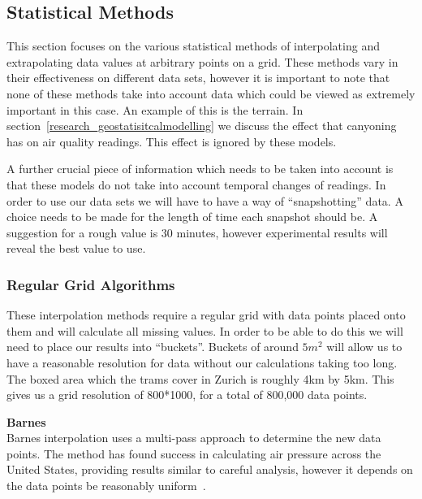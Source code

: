 	\subsection{Statistical Methods}\label{datavalidation_statisticalmethods}
		This section focuses on the various statistical methods of interpolating and extrapolating data values at arbitrary points on a grid. These methods vary in their effectiveness on different data sets, however it is important to note that none of these methods take into account data which could be viewed as extremely important in this case. An example of this is the terrain. In section~\ref{research_geostatisitcalmodelling} we discuss the effect that canyoning has on air quality readings. This effect is ignored by these models. 

		A further crucial piece of information which needs to be taken into account is that these models do not take into account temporal changes of readings. In order to use our data sets we will have to have a way of ``snapshotting'' data. A choice needs to be made for the length of time each snapshot should be. A suggestion for a rough value is 30 minutes, however experimental results will reveal the best value to use.



		\subsubsection{Regular Grid Algorithms}\label{datavalidation_regulargrid}

			These interpolation methods require a regular grid with data points placed onto them and will calculate all missing values. In order to be able to do this we will need to place our results into ``buckets''. Buckets of around $5m^{2}$ will allow us to have a reasonable resolution for data without our calculations taking too long. The boxed area which the trams cover in Zurich is roughly 4km by 5km. This gives us a grid resolution of 800*1000, for a total of 800,000 data points. 

			\textbf{Barnes}\label{datavalidation_barnes} \\

				Barnes interpolation uses a multi-pass approach to determine the new data points. The method has found success in calculating air pressure across the United States, providing results similar to careful analysis, however it depends on the data points be reasonably uniform~\cite{barnesinterpolation}.


